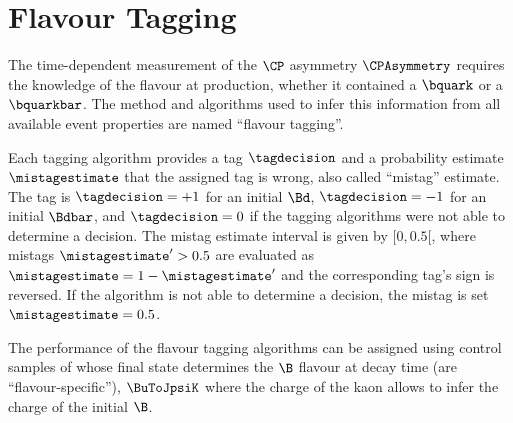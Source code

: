 
\chapter{Flavour Tagging}
\label{ch:flavour_tagging}

The time-dependent measurement of the $\CP$ asymmetry $\CPAsymmetry$ 
requires the knowledge of the \Bmeson flavour at production, \ie whether it
contained a $\bquark$ or a $\bquarkbar$. The method and algorithms used to infer
this information from all available event properties are named \enquote{flavour
tagging}.

Each tagging algorithm provides a tag $\tagdecision$ and a probability estimate
$\mistagestimate$ that the assigned tag is wrong, also called \enquote{mistag}
estimate. The tag is $\tagdecision=+1$ for an initial $\Bd$, $\tagdecision=-1$
for an initial $\Bdbar$, and $\tagdecision=0$ if the tagging algorithms were not
able to determine a decision. The mistag estimate interval is given by
${[0,0.5[}$, where mistags $\mistagestimate^{\prime}>0.5$ are evaluated as
$\mistagestimate = 1 - \mistagestimate^{\prime}$ and the corresponding tag's
sign is reversed. If the algorithm is not able to determine a decision, the
mistag is set $\mistagestimate=0.5$.

The performance of the flavour tagging algorithms can be assigned using control
samples of \Bmesons whose final state determines the $\B$ flavour at decay
time (\ie are \enquote{flavour-specific}), \eg $\BuToJpsiK$ where the charge of
the kaon allows to infer the charge of the initial $\B$.

